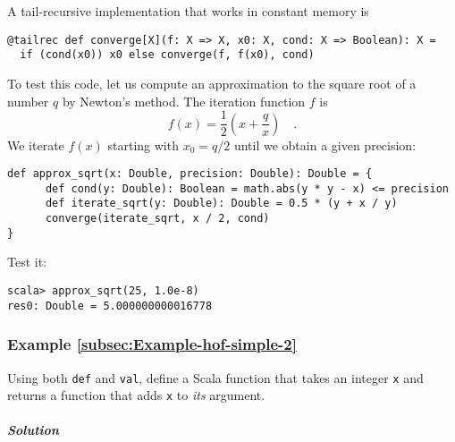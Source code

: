 A tail-recursive implementation that works in constant memory is 
\begin{lstlisting}
@tailrec def converge[X](f: X => X, x0: X, cond: X => Boolean): X =
  if (cond(x0)) x0 else converge(f, f(x0), cond)
\end{lstlisting}
To test this code, let us compute an approximation to the square root
of a number $q$ by Newton's method. The iteration function $f$ is
\[
f(x)=\frac{1}{2}\left(x+\frac{q}{x}\right)\quad.
\]
We iterate $f(x)$ starting with $x_{0}=q/2$ until we obtain a given
precision:
\begin{lstlisting}
def approx_sqrt(x: Double, precision: Double): Double = {
      def cond(y: Double): Boolean = math.abs(y * y - x) <= precision
      def iterate_sqrt(y: Double): Double = 0.5 * (y + x / y)
      converge(iterate_sqrt, x / 2, cond)
}
\end{lstlisting}
Test it:
\begin{lstlisting}
scala> approx_sqrt(25, 1.0e-8)
res0: Double = 5.000000000016778
\end{lstlisting}

\subsubsection{Example \label{subsec:Example-hof-simple-2}\ref{subsec:Example-hof-simple-2}}

Using both \lstinline!def!
and \lstinline!val!, define
a Scala function that takes an integer \lstinline!x!
and returns a function that adds \lstinline!x!
to \emph{its} argument.

\subparagraph{Solution}

